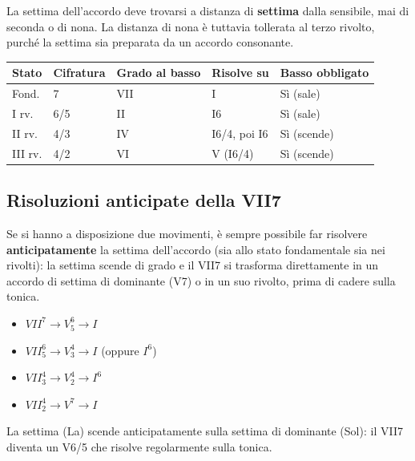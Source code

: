 \begin{osservazione}
	\label{oss:disposizione_settima}
	La settima dell'accordo deve trovarsi a distanza di \textbf{settima} dalla sensibile, mai di seconda o di nona. La distanza di nona è tuttavia tollerata al terzo rivolto, purché la settima sia preparata da un accordo consonante.
\end{osservazione}

\begin{center}
\begin{tabular}{|l|l|l|l|l|}
\hline
Stato & Cifratura & Grado al basso & Risolve su & Basso obbligato \\
\hline
Fond. & 7 & VII & I & Sì (sale) \\
I rv. & 6/5 & II & I6 & Sì (sale) \\
II rv. & 4/3 & IV & I6/4, poi I6 & Sì (scende) \\
III rv. & 4/2 & VI & V (I6/4) & Sì (scende) \\
\hline
\end{tabular}
\end{center}

\subsection{Risoluzioni anticipate della VII7}
\label{subsec:risoluzioni_anticipate}

Se si hanno a disposizione due movimenti, è sempre possibile far risolvere \textbf{anticipatamente} la settima dell'accordo (sia allo stato fondamentale sia nei rivolti): la settima scende di grado e il VII7 si trasforma direttamente in un accordo di settima di dominante (V7) o in un suo rivolto, prima di cadere sulla tonica.

\begin{regola}
	\label{reg:risoluzioni_anticipate}
	\begin{itemize}
		\item $VII^7 \rightarrow V^6_5 \rightarrow I$
		\item $VII^6_5 \rightarrow V^4_3 \rightarrow I$ (oppure $I^6$)
		\item $VII^4_3 \rightarrow V^4_2 \rightarrow I^6$
		\item $VII^4_2 \rightarrow V^7 \rightarrow I$
	\end{itemize}
\end{regola}

\begin{esempio}
	\label{ex:risoluzione_anticipata}
	La settima (La) scende anticipatamente sulla settima di dominante (Sol): il VII7 diventa un V6/5 che risolve regolarmente sulla tonica.
\end{esempio}

